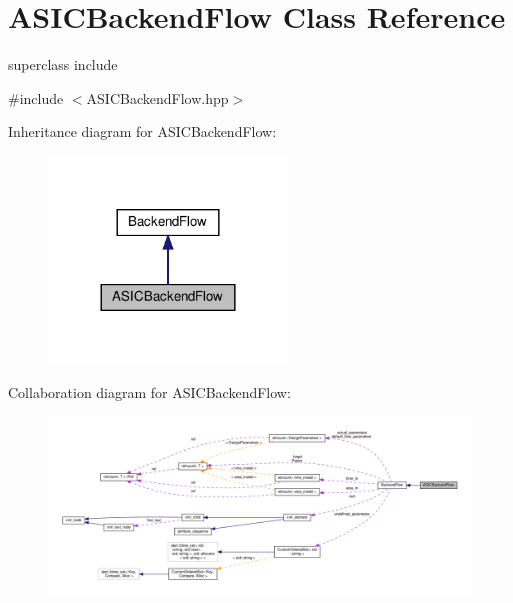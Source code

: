 \hypertarget{classASICBackendFlow}{}\section{A\+S\+I\+C\+Backend\+Flow Class Reference}
\label{classASICBackendFlow}


superclass include  




{\ttfamily \#include $<$A\+S\+I\+C\+Backend\+Flow.\+hpp$>$}



Inheritance diagram for A\+S\+I\+C\+Backend\+Flow\+:
\nopagebreak
\begin{figure}[H]
\begin{center}
\leavevmode
\includegraphics[width=180pt]{d9/dd9/classASICBackendFlow__inherit__graph}
\end{center}
\end{figure}


Collaboration diagram for A\+S\+I\+C\+Backend\+Flow\+:
\nopagebreak
\begin{figure}[H]
\begin{center}
\leavevmode
\includegraphics[width=350pt]{d0/dc2/classASICBackendFlow__coll__graph}
\end{center}
\end{figure}
